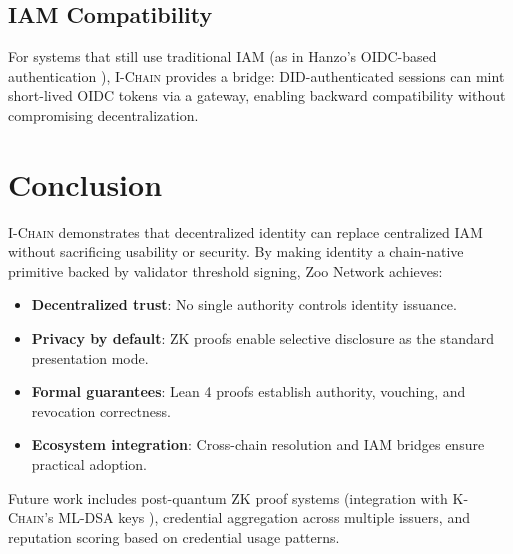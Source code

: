 \documentclass[11pt,letterpaper]{article}
\theoremstyle{definition}
\theoremstyle{remark}
\newcommand{\IChain}{\textsc{I-Chain}}
\newcommand{\KChain}{\textsc{K-Chain}}
\begin{document}
\subsection{IAM Compatibility}

For systems that still use traditional IAM (as in Hanzo's OIDC-based authentication \cite{lux-id-iam}), \IChain{} provides a bridge: DID-authenticated sessions can mint short-lived OIDC tokens via a gateway, enabling backward compatibility without compromising decentralization.

\section{Conclusion}

\IChain{} demonstrates that decentralized identity can replace centralized IAM without sacrificing usability or security. By making identity a chain-native primitive backed by validator threshold signing, Zoo Network achieves:

\begin{itemize}
\item \textbf{Decentralized trust}: No single authority controls identity issuance.
\item \textbf{Privacy by default}: ZK proofs enable selective disclosure as the standard presentation mode.
\item \textbf{Formal guarantees}: Lean 4 proofs establish authority, vouching, and revocation correctness.
\item \textbf{Ecosystem integration}: Cross-chain resolution and IAM bridges ensure practical adoption.
\end{itemize}

Future work includes post-quantum ZK proof systems (integration with \KChain{}'s ML-DSA keys \cite{zoo-key-management}), credential aggregation across multiple issuers, and reputation scoring based on credential usage patterns.
\end{document}
